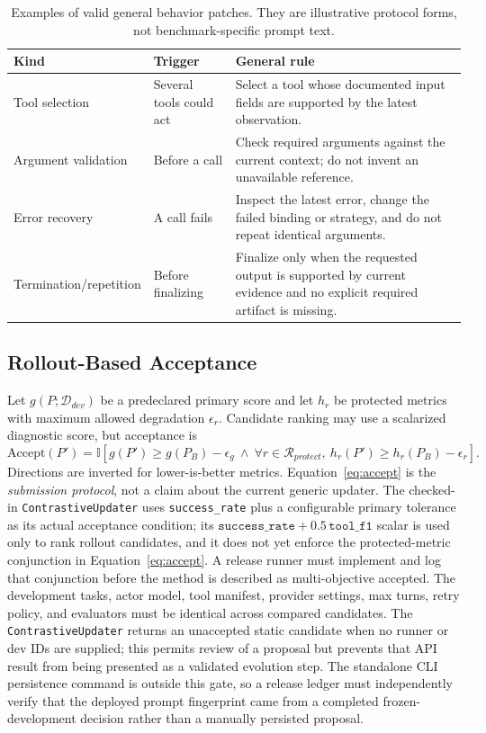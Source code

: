 \documentclass[10pt]{article}
\begin{document}
\begin{table}[t]
\centering
\caption{Examples of valid general behavior patches. They are illustrative protocol forms, not benchmark-specific prompt text.}
\label{tab:patches}
\small
\begin{tabular}{p{1.8cm}p{2.1cm}p{3.5cm}}
\toprule
Kind & Trigger & General rule \\
\midrule
Tool selection & Several tools could act & Select a tool whose documented input fields are supported by the latest observation. \\
Argument validation & Before a call & Check required arguments against the current context; do not invent an unavailable reference. \\
Error recovery & A call fails & Inspect the latest error, change the failed binding or strategy, and do not repeat identical arguments. \\
Termination/repetition & Before finalizing & Finalize only when the requested output is supported by current evidence and no explicit required artifact is missing. \\
\bottomrule
\end{tabular}
\end{table}

\subsection{Rollout-Based Acceptance}
Let $g(P;\mathcal{D}_{dev})$ be a predeclared primary score and let $h_r$ be protected metrics with maximum allowed degradation $\epsilon_r$. Candidate ranking may use a scalarized diagnostic score, but acceptance is
\begin{equation}
\mathrm{Accept}(P')=\mathbb{I}\left[g(P')\geq g(P_B)-\epsilon_g\ \wedge\ \forall r\in\mathcal{R}_{protect},\ h_r(P')\geq h_r(P_B)-\epsilon_r\right].
\label{eq:accept}
\end{equation}
Directions are inverted for lower-is-better metrics. Equation~\ref{eq:accept} is the \emph{submission protocol}, not a claim about the current generic updater. The checked-in \texttt{ContrastiveUpdater} uses \texttt{success\_rate} plus a configurable primary tolerance as its actual acceptance condition; its $\texttt{success\_rate}+0.5\,\texttt{tool\_f1}$ scalar is used only to rank rollout candidates, and it does not yet enforce the protected-metric conjunction in Equation~\ref{eq:accept}. A release runner must implement and log that conjunction before the method is described as multi-objective accepted. The development tasks, actor model, tool manifest, provider settings, max turns, retry policy, and evaluators must be identical across compared candidates. The \texttt{ContrastiveUpdater} returns an unaccepted static candidate when no runner or dev IDs are supplied; this permits review of a proposal but prevents that API result from being presented as a validated evolution step. The standalone CLI persistence command is outside this gate, so a release ledger must independently verify that the deployed prompt fingerprint came from a completed frozen-development decision rather than a manually persisted proposal.
\end{document}
